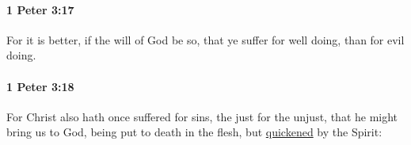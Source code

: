 		\paragraph{1 Peter 3:17} %
			\label{1PETER-3-17}

			For it is better, if the will of God be so, that ye suffer for well doing, than for evil doing.

			\begin{framed}
			\scriptsize
				\begin{compactdesc}
					\item[SBLG] 
				\end{compactdesc}
			\end{framed}

		\paragraph{1 Peter 3:18} %
			\label{1PETER-3-18}

			For Christ also hath once suffered for sins, the just for the unjust, that he might bring us to God, being put to death in the flesh, but \hyperref[QUICKEN]{quickened} by the Spirit:

